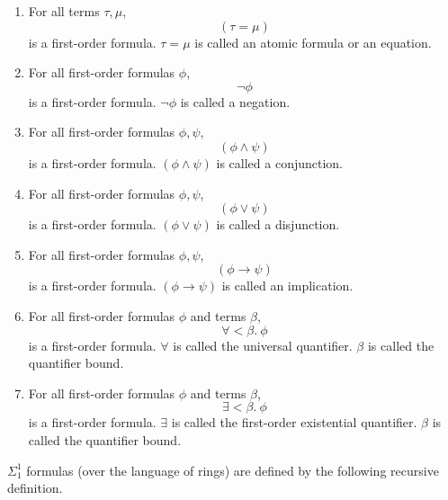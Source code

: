 \documentclass[11pt]{article}
\begin{document}
\begin{enumerate}
	\item For all terms $\tau, \mu$,
		\begin{equation}
			(\tau = \mu)
		\end{equation}
		is a first-order formula. $\tau = \mu$ is called an atomic formula or an equation.
	\item For all first-order formulas $\phi$,
		\begin{equation}
			\neg\phi
		\end{equation}
		is a first-order formula. $\neg\phi$ is called a negation.
	\item For all first-order formulas $\phi, \psi$, 
		\begin{equation}
			(\phi \wedge \psi)
		\end{equation}
		is a first-order formula. $(\phi \wedge \psi)$ is called a conjunction.
	\item For all first-order formulas $\phi, \psi$,
		\begin{equation}
			(\phi \vee \psi)
		\end{equation}
		is a first-order formula. $(\phi \vee \psi)$ is called a disjunction.
	\item For all first-order formulas $\phi, \psi$,
		\begin{equation}
			(\phi \to \psi)
		\end{equation}
		is a first-order formula. $(\phi \to \psi)$ is called an implication.
	\item For all first-order formulas $\phi$ and terms $\beta$,
		\begin{equation}
			\forall < \beta.\ \phi
		\end{equation}
		is a first-order formula. $\forall$ is called the universal quantifier. $\beta$ is called the quantifier bound.
	\item For all first-order formulas $\phi$ and terms $\beta$,
		\begin{equation}
			\exists < \beta.\ \phi
		\end{equation}
		is a first-order formula. $\exists$ is called the first-order existential quantifier. $\beta$ is called the quantifier bound.
\end{enumerate}

$\Sigma^1_1$ formulas (over the language of rings) are defined by the following recursive definition.
\end{document}
